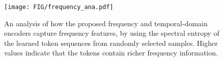 

\begin{figure}[t]
    \centering
    \texttt{[image: FIG/frequency\_ana.pdf]}
    \caption{
    An analysis of how the proposed frequency and temporal-domain encoders capture frequency features, by using the spectral entropy of the learned token sequences from randomly selected samples. 
    Higher values indicate that the tokens contain richer frequency information.}
    \label{fig:frequeny_ana}
\end{figure}




